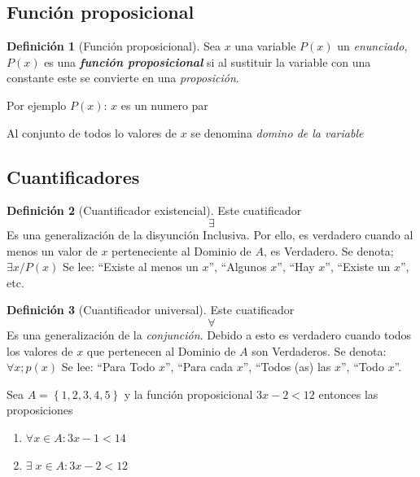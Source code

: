 \documentclass[
  16pt,
]{krantz}
\providecommand{\tightlist}{%
  \setlength{\itemsep}{0pt}\setlength{\parskip}{0pt}}
\theoremstyle{definition}
\newtheorem{definition}{Definición}[chapter]
\theoremstyle{definition}
\theoremstyle{definition}
\theoremstyle{definition}
\theoremstyle{remark}
\begin{document}
\hypertarget{funciuxf3n-proposicional}{%
\subsection{Función proposicional}\label{funciuxf3n-proposicional}}

\begin{definition}[Función proposicional]
\protect\hypertarget{def:proposicional}{}\label{def:proposicional}Sea \(x\) una variable \(P(x)\) un \emph{enunciado}, \(P(x)\) es una \textbf{\emph{función proposicional}} si al sustituir la variable con una constante este se convierte en una \emph{proposición}.
\end{definition}

Por ejemplo \(P(x)\): \(x\) es un numero par

Al conjunto de todos lo valores de \(x\) se denomina \emph{domino de la variable}

\hypertarget{cuantificadores}{%
\subsection{Cuantificadores}\label{cuantificadores}}

\begin{definition}[Cuantificador existencial]
\protect\hypertarget{def:existencial}{}\label{def:existencial}Este cuatificador
\[\exists\]
Es una generalización de la disyunción Inclusiva. Por ello, es verdadero cuando al menos un valor de \(x\) perteneciente al Dominio de \(A\), es Verdadero. Se denota; \(\exists x / P (x)\) Se lee: ``Existe al menos un \(x\)'', ``Algunos \(x\)'', ``Hay \(x\)'', ``Existe un \(x\)'', etc.
\end{definition}

\begin{definition}[Cuantificador universal]
\protect\hypertarget{def:universal}{}\label{def:universal}Este cuatificador
\[\forall\]
Es una generalización de la \emph{conjunción}. Debido a esto es verdadero cuando todos los valores de \(x\) que pertenecen al Dominio de \(A\) son Verdaderos. Se denota: \(\forall x ; p(x)\) Se lee: ``Para Todo \(x\)'', ``Para cada \(x\)'', ``Todos (as) las \(x\)'', ``Todo \(x\)''.
\end{definition}

Sea \(A=\left\{1,2,3,4,5\right\}\) y la función proposicional \(3x-2<12\) entonces las proposiciones

\begin{enumerate}
\def\labelenumi{\arabic{enumi}.}
\tightlist
\item
  \(\forall x\in A:3x-1<14\)
\item
  \(\exists\; x\in A:3x-2<12\)
\end{enumerate}
\end{document}
